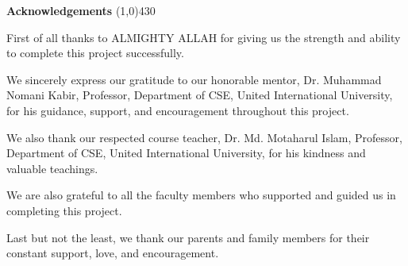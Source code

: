 \begin{center}
{\huge \bf Acknowledgements}
\line(1,0){430}
\end{center}


First of all thanks to ALMIGHTY ALLAH for giving us the strength and ability to complete this project successfully.

We sincerely express our gratitude to our honorable mentor, Dr. Muhammad Nomani Kabir, Professor, Department of CSE, United International University, for his guidance, support, and encouragement throughout this project.

We also thank our respected course teacher, Dr. Md. Motaharul Islam, Professor, Department of CSE, United International University, for his kindness and valuable teachings.

We are also grateful to all the faculty members who supported and guided us in completing this project.

Last but not the least, we thank our parents and family members for their constant support, love, and encouragement.

